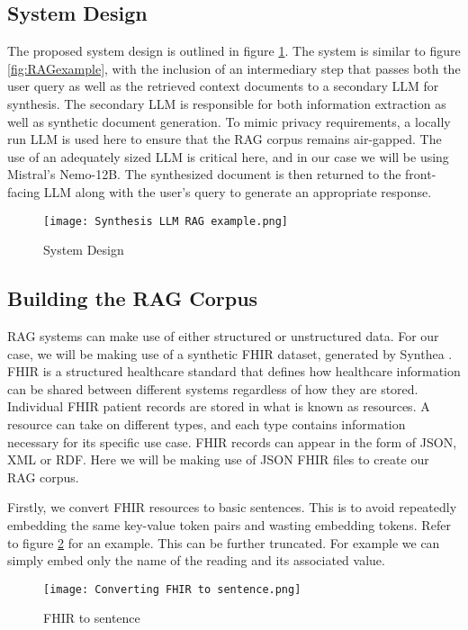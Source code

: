 \subsection{System Design}

The proposed system design is outlined in figure \ref{fig:SynthLLMRAG}.
The system is similar to figure \ref{fig:RAGexample}, with the inclusion of an intermediary step that passes both the user query as well as the retrieved context documents to a secondary LLM for synthesis.
The secondary LLM is responsible for both information extraction as well as synthetic document generation.
To mimic privacy requirements, a locally run LLM is used here to ensure that the RAG corpus remains air-gapped.
The use of an adequately sized LLM is critical here, and in our case we will be using Mistral's Nemo-12B.
The synthesized document is then returned to the front-facing LLM along with the user's query to generate an appropriate response.

\begin{figure}
	\texttt{[image: Synthesis LLM RAG example.png]}
	\caption{System Design}
	\centering
	\label{fig:SynthLLMRAG}
\end{figure}

\subsection{Building the RAG Corpus}
RAG systems can make use of either structured or unstructured data.
For our case, we will be making use of a synthetic FHIR dataset, generated by Synthea \autocite{Synthea2024}.
FHIR is a structured healthcare standard that defines how healthcare information can be shared between different systems regardless of how they are stored.
Individual FHIR patient records are stored in what is known as resources.
A resource can take on different types, and each type contains information necessary for its specific use case.
FHIR records can appear in the form of JSON, XML or RDF.
Here we will be making use of JSON FHIR files to create our RAG corpus.

Firstly, we convert FHIR resources to basic sentences.
This is to avoid repeatedly embedding the same key-value token pairs and wasting embedding tokens.
Refer to figure \ref{fig:FHIRtoSentence} for an example.
This can be further truncated.
For example we can simply embed only the name of the reading and its associated value.

\begin{figure}
	\texttt{[image: Converting FHIR to sentence.png]}
	\caption{FHIR to sentence}
	\centering
	\label{fig:FHIRtoSentence}
\end{figure}

